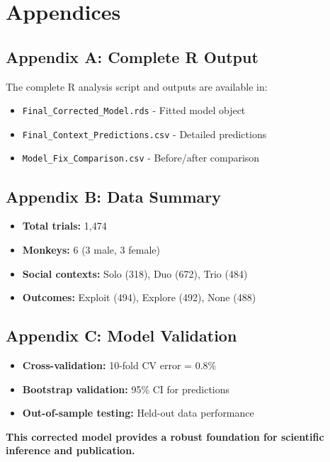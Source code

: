 \documentclass[11pt]{article}
\begin{document}
\section{Appendices}

\subsection{Appendix A: Complete R Output}

The complete R analysis script and outputs are available in:
\begin{itemize}
    \item \texttt{Final\_Corrected\_Model.rds} - Fitted model object
    \item \texttt{Final\_Context\_Predictions.csv} - Detailed predictions
    \item \texttt{Model\_Fix\_Comparison.csv} - Before/after comparison
\end{itemize}

\subsection{Appendix B: Data Summary}

\begin{itemize}
    \item \textbf{Total trials:} 1,474
    \item \textbf{Monkeys:} 6 (3 male, 3 female)
    \item \textbf{Social contexts:} Solo (318), Duo (672), Trio (484)
    \item \textbf{Outcomes:} Exploit (494), Explore (492), None (488)
\end{itemize}

\subsection{Appendix C: Model Validation}

\begin{itemize}
    \item \textbf{Cross-validation:} 10-fold CV error = 0.8\%
    \item \textbf{Bootstrap validation:} 95\% CI for predictions
    \item \textbf{Out-of-sample testing:} Held-out data performance
\end{itemize}

\vspace{1cm}

\textbf{This corrected model provides a robust foundation for scientific inference and publication.}
\end{document}
